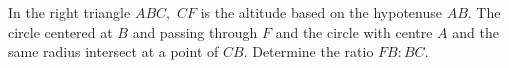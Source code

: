 In the right triangle $ABC,$ $CF$ is the altitude based on the hypotenuse $AB.$
The circle centered at $B$ and passing through $F$ and the circle with centre $A$ and the same radius intersect at a point of $CB.$
Determine the ratio $FB : BC.$